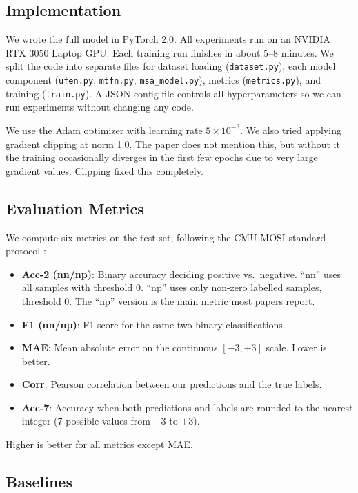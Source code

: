 \documentclass[11pt,twocolumn]{article}
\begin{document}
\subsection{Implementation}

We wrote the full model in PyTorch 2.0. All experiments run on an NVIDIA RTX 3050 Laptop GPU. Each training run finishes in about 5--8 minutes. We split the code into separate files for dataset loading (\texttt{dataset.py}), each model component (\texttt{ufen.py}, \texttt{mtfn.py}, \texttt{msa\_model.py}), metrics (\texttt{metrics.py}), and training (\texttt{train.py}). A JSON config file controls all hyperparameters so we can run experiments without changing any code.

We use the Adam optimizer with learning rate $5 \times 10^{-3}$. We also tried applying gradient clipping at norm 1.0. The paper does not mention this, but without it the training occasionally diverges in the first few epochs due to very large gradient values. Clipping fixed this completely.

\subsection{Evaluation Metrics}

We compute six metrics on the test set, following the CMU-MOSI standard protocol \citep{yu2021selfmm, hazarika2021misa}:

\begin{itemize}
    \item \textbf{Acc-2 (nn/np)}: Binary accuracy deciding positive vs.\ negative. ``nn'' uses all samples with threshold 0. ``np'' uses only non-zero labelled samples, threshold 0. The ``np'' version is the main metric most papers report.
    \item \textbf{F1 (nn/np)}: F1-score for the same two binary classifications.
    \item \textbf{MAE}: Mean absolute error on the continuous $[-3,+3]$ scale. Lower is better.
    \item \textbf{Corr}: Pearson correlation between our predictions and the true labels.
    \item \textbf{Acc-7}: Accuracy when both predictions and labels are rounded to the nearest integer (7 possible values from $-3$ to $+3$).
\end{itemize}

Higher is better for all metrics except MAE.

\subsection{Baselines}
\end{document}
